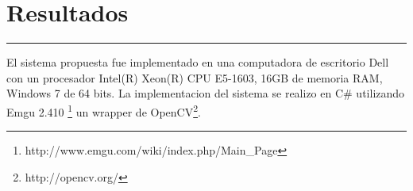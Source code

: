 \chapter{Resultados}\label{capit:cap5}
\vspace{-2.0325ex}%
\noindent
\rule{\textwidth}{0.5pt}
\vspace{-5.5ex}%
\newcommand{\pushline}{\Indp}%

El sistema propuesta fue implementado en una computadora de escritorio Dell con un procesador Intel(R) Xeon(R) CPU E5-1603, 16GB de memoria RAM, Windows 7 de 64 bits. La implementacion del sistema se realizo en C# utilizando Emgu 2.410 \footnote{http://www.emgu.com/wiki/index.php/Main_Page} un wrapper de OpenCV\footnote{http://opencv.org/}.  



